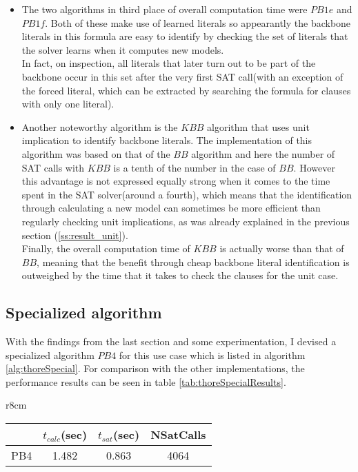 \begin{itemize}
\item The two algorithms in third place of overall computation time were $PB1e$ and $PB1f$. Both of these make use of learned literals so appearantly the backbone literals in this formula are easy to identify by checking the set of literals that the solver learns when it computes new models.\\
In fact, on inspection, all literals that later turn out to be part of the backbone occur in this set after the very first SAT call(with an exception of the forced literal, which can be extracted by searching the formula for clauses with only one literal).
\item Another noteworthy algorithm is the $KBB$ algorithm that uses unit implication to identify backbone literals. The implementation of this algorithm was based on that of the $BB$ algorithm and here the number of SAT calls with $KBB$ is a tenth of the number in the case of $BB$. However this advantage is not expressed equally strong when it comes to the time spent in the SAT solver(around a fourth), which means that the identification through calculating a new model can sometimes be more efficient than regularly checking unit implications, as was already explained in the previous section (\ref{ss:result_unit}).\\
Finally, the overall computation time of $KBB$ is actually worse than that of $BB$, meaning that the benefit through cheap backbone literal identification is outweighed by the time that it takes to check the clauses for the unit case. 
\end{itemize}

\subsection{Specialized algorithm}

With the findings from the last section and some experimentation, I devised a specialized algorithm $PB4$ for this use case which is listed in algorithm \ref{alg:thoreSpecial}. For comparison with the other implementations, the performance results can be seen in table \ref{tab:thoreSpecialResults}.

\begin{wraptable}[7]{r}{8cm}
\begin{tabular}{l| c c c }
&	$t_{calc}$(sec) &	$t_{sat}$(sec)	& NSatCalls \\
\hline
PB4 & 1.482 & 0.863 & 4064 \\
\end{tabular}
\caption{Results of specialized backbone algorithm on product formula benchmark.}
\label{tab:thoreSpecialResults}
\end{wraptable}

